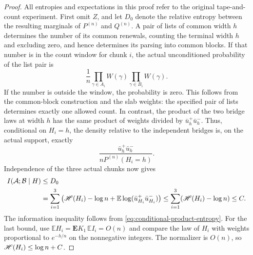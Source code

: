 \begin{proof}
All entropies and expectations in this proof refer to the original
tape-and-count experiment.
First omit \(Z\), and let \(D_0\) denote the relative entropy between
the resulting marginals of \(P^{(n)}\) and \(Q^{(n)}\).  A pair of lists
of common width \(h\) determines the number of its common renewals,
counting the terminal width \(h\) and excluding zero, and hence determines
its parsing into common blocks.  If that number is in the count window
for chunk \(i\), the actual unconditioned probability of the list pair is
\[
 \frac1n
 \prod_{\gamma\in A_i}W(\gamma)
 \prod_{\gamma\in B_i}W(\gamma).
\]
If the number is outside the window, the probability is zero.  This follows
from the common-block construction and the slab weights: the specified
pair of lists determines exactly one allowed count.  In contrast, the
product of the two bridge laws at width \(h\) has the same product of
weights divided by \(\bar u_h^+\bar u_h^-\).  Thus, conditional on
\(H_i=h\), the density relative to the independent bridges is, on the
actual support, exactly
\begin{equation}
 \frac{\bar u_h^+\bar u_h^-}
      {nP^{(n)}(H_i=h)}.
 \label{eq:chunk-pair-density}
\end{equation}
Independence of the three actual chunks now gives
\begin{align}
 I(\mathcal A;\mathcal B\mid H)
 &\le D_0\notag\\
 &=\sum_{i=1}^3
   \left(\mathscr H(H_i)-\log n
          +\mathbb E\log(\bar u_{H_i}^+\bar u_{H_i}^-)\right)
 \le\sum_{i=1}^3(\mathscr H(H_i)-\log n)
 \le C.
 \label{eq:chunk-entropy-cost}
\end{align}
The information inequality follows from
\eqref{eq:conditional-product-entropy}.  For the last bound, use
\(\mathbb E H_i=\mathbf E K_1\,\mathbb E I_i=O(n)\) and compare the
law of \(H_i\) with weights proportional to \(e^{-h/n}\) on the
nonnegative integers.  The normalizer is \(O(n)\), so
\(\mathscr H(H_i)\le\log n+C\).


\end{proof}
